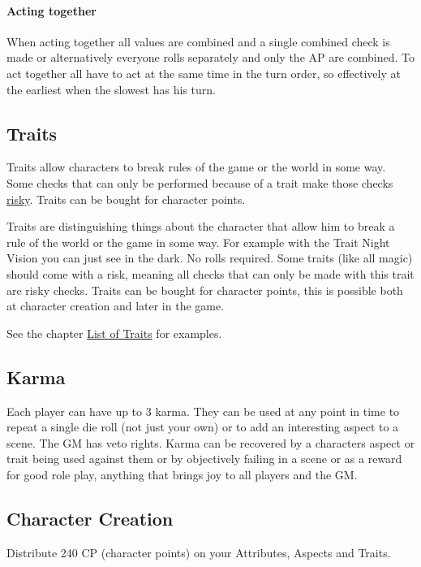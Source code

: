 \documentclass[11pt]{article}
\begin{document}
{\paragraph*{Acting together}
\label{sec:org50fb300}
When acting together all values are combined and a single combined check is made or alternatively everyone rolls separately and only the AP are combined. To act together all have to act at the same time in the turn order, so effectively at the earliest when the slowest has his turn.
\subsection{Traits}
\label{sec:orgc762a3c}
\begin{short}
Traits allow characters to break rules of the game or the world in some way. Some checks that can only be performed because of a trait make those checks \hyperref[sec:orgba75c45]{risky}. Traits can be bought for character points.
\end{short}

Traits are distinguishing things about the character that allow him to break a rule of the world or the game in some way. For example with the Trait Night Vision you can just see in the dark. No rolls required. Some traits (like all magic) should come with a risk, meaning all checks that can only be made with this trait are risky checks. Traits can be bought for character points, this is possible both at character creation and later in the game.

See the chapter \hyperref[sec:org0bba13c]{List of Traits} for examples.
\subsection{Karma}
\label{sec:org61d3206}
\begin{short}
Each player can have up to 3 karma. They can be used at any point in time to repeat a single die roll (not just your own) or to add an interesting aspect to a scene. The GM has veto rights. Karma can be recovered by a characters aspect or trait being used against them or by objectively failing in a scene or as a reward for good role play, anything that brings joy to all players and the GM. 
\end{short}
\subsection{Character Creation}
\label{sec:orgd810251}
\begin{short}
Distribute 240 CP (character points) on your Attributes, Aspects and Traits.


\end{short}}
\end{document}
